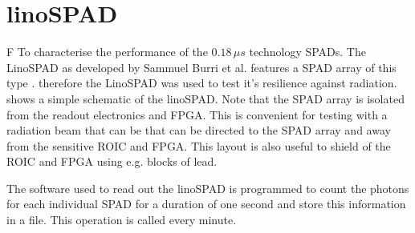 \section{linoSPAD}\label{ssec:linoSPAD}
F
To characterise the performance of the $0.18\,\mu s$ technology SPADs. The LinoSPAD as developed by Sammuel Burri et al. features a SPAD array of this type \cite{burri2016linospad}. therefore the LinoSPAD was used to test it's resilience against radiation.  shows a simple schematic of the linoSPAD. Note that the SPAD array is isolated from the readout electronics and FPGA. This is convenient for testing with a radiation beam that can be that can be directed to the SPAD array and away from the sensitive ROIC and FPGA. This layout is also useful to shield of the ROIC and FPGA using e.g. blocks of lead.



The software used to read out the linoSPAD is programmed to count the photons for each individual SPAD for a duration of one second and store this information in a file. This operation is called every minute.
